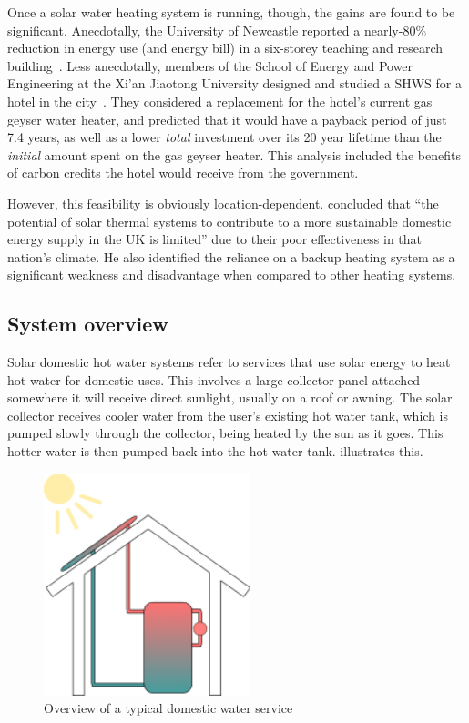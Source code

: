 Once a solar water heating system is running, though, the gains are found to be significant.
Anecdotally, the University of Newcastle reported a nearly-80\% reduction in energy use (and energy bill) in a six-storey teaching and research building~\cite{ApricusNewcastle}.
Less anecdotally, members of the School of Energy and Power Engineering at the Xi'an Jiaotong University designed and studied a SHWS for a hotel in the city~\cite{Cao14}.
They considered a replacement for the hotel's current gas geyser water heater, and predicted that it would have a payback period of just 7.4 years, as well as a lower \emph{total} investment over its 20 year lifetime than the \emph{initial} amount spent on the gas geyser heater.
This analysis included the benefits of carbon credits the hotel would receive from the government.

However, this feasibility is obviously location-dependent.
\textcite{Greening14} concluded that ``the potential of solar thermal systems to contribute to a more sustainable domestic energy supply in the UK is limited'' due to their poor effectiveness in that nation's climate.
He also identified the reliance on a backup heating system as a significant weakness and disadvantage when compared to other heating systems.

\subsection{System overview}
\label{sec:background:system}

Solar domestic hot water systems refer to services that use solar energy to heat hot water for domestic uses.
This involves a large collector panel attached somewhere it will receive direct sunlight, usually on a roof or awning.
The solar collector receives cooler water from the user's existing hot water tank, which is pumped slowly through the collector, being heated by the sun as it goes.
This hotter water is then pumped back into the hot water tank.
 illustrates this.

\begin{figure}
   \centering
   \includegraphics[width=6cm]{images/house}
   \caption{Overview of a typical domestic water service}
   \label{fig:hot-water-service}
\end{figure}

